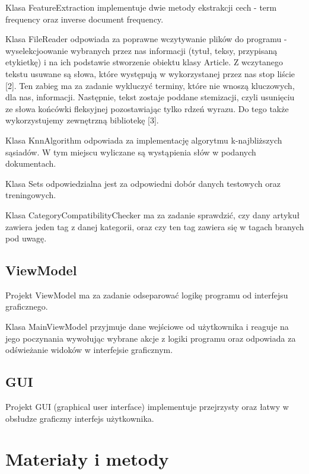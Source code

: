 \documentclass{classrep}
\begin{document}
Klasa FeatureExtraction implementuje dwie metody ekstrakcji cech - term frequency oraz inverse document frequency. \newline

Klasa FileReader odpowiada za poprawne wczytywanie plików do programu - wyselekcjoowanie wybranych przez nas informacji (tytuł, teksy, przypisaną etykietkę) i na ich podstawie stworzenie obiektu klasy Article. Z wczytanego tekstu usuwane są słowa, które występują w wykorzystanej przez nas stop liście [2]. Ten zabieg ma za zadanie wykluczyć terminy, które nie wnoszą kluczowych, dla nas, informacji. Następnie, tekst zostaje poddane stemizacji, czyli usunięciu ze słowa końcówki fleksyjnej pozostawiając tylko rdzeń wyrazu. Do tego także wykorzystujemy zewnętrzną bibliotekę [3]. \newline

Klasa KnnAlgorithm odpowiada za implementację algorytmu k-najbliższych sąsiadów. W tym miejscu wyliczane są wystąpienia słów w podanych dokumentach. \newline

Klasa Sets odpowiedzialna jest za odpowiedni dobór danych testowych oraz treningowych. \newline

Klasa CategoryCompatibilityChecker ma za zadanie sprawdzić, czy dany artykuł zawiera jeden tag z danej kategorii, oraz czy ten tag zawiera się w tagach branych pod uwagę.

\subsection{ViewModel}
Projekt ViewModel ma za zadanie odseparować logikę programu od interfejsu graficznego. \newline

Klasa MainViewModel przyjmuje dane wejściowe od użytkownika i reaguje na jego poczynania wywołując wybrane akcje z logiki programu oraz odpowiada za odświeżanie widoków w interfejsie graficznym.  

\subsection{GUI}
Projekt GUI (graphical user interface) implementuje przejrzysty oraz łatwy w obsłudze graficzny interfejs użytkownika. 

\section{Materiały i metody}
\end{document}
